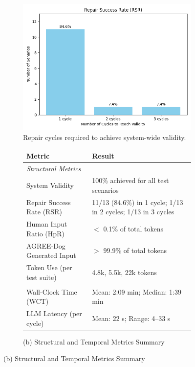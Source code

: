 \begin{figure}[t]
  \centering
  \caption{AGREE-Dog Evaluation Metrics and Convergence}
  \label{fig:agree-metrics-combined}

\begin{subfigure}{\textwidth}
    \centering
    \includegraphics[width=0.6\linewidth]{repair-histogram.png}
    \caption{Repair cycles required to achieve system-wide validity.}
    \label{fig:repair-histogram}
  \end{subfigure}

  \vspace{1em}
  
  \begin{subfigure}{\textwidth}
    \centering
    \caption*{(b) Structural and Temporal Metrics Summary}
    \begin{minipage}{\textwidth}
      \centering
      \begin{tabular}{@{}p{} p{}@{}}
        \toprule
        \textbf{Metric} & \textbf{Result} \\
        \midrule
        \multicolumn{2}{l}{\textit{Structural Metrics}} \\
        System Validity & 100\% achieved for all test scenarios\\
        Repair Success Rate (RSR) & 11/13 (84.6\%) in 1 cycle; 1/13 in 2 cycles; 1/13 in 3 cycles \\
        Human Input Ratio (HpR) & $<$ 0.1\% of total tokens \\
        AGREE-Dog Generated Input & $>$ 99.9\% of total tokens \\
        Token Use (per test suite) & 4.8k, 5.5k, 22k tokens \\
        \addlinespace
        \multicolumn{2}{l}{\textit{Temporal Metrics}} \\
        Wall-Clock Time (WCT) & Mean: 2:09 min; Median: 1:39 min \\
        LLM Latency (per cycle) & Mean: 22 s; Range: 4--33 s \\
        \bottomrule
      \end{tabular}
    \end{minipage}
  \end{subfigure}

\end{figure}